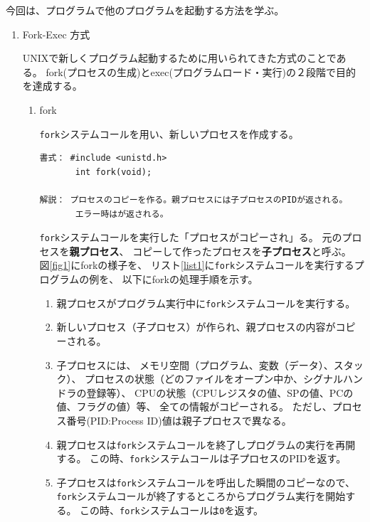 \documentclass[a4j,dvipdfmx]{jarticle}
\begin{document}
\def\lstlistingname{リスト}


今回は、プログラムで他のプログラムを起動する方法を学ぶ。

\begin{enumerate}
\item Fork-Exec 方式

UNIXで新しくプログラム起動するために用いられてきた方式のことである。
fork(プロセスの生成)とexec(プログラムロード・実行)の２段階で目的を達成する。

\begin{enumerate}
\item fork

\verb/fork/システムコールを用い、新しいプロセスを作成する。

\begin{lstlisting}[numbers=none]
書式： #include <unistd.h>
       int fork(void);

解説： プロセスのコピーを作る。親プロセスには子プロセスのPIDが返される。
       エラー時はが返される。
\end{lstlisting}

\verb/fork/システムコールを実行した「プロセスがコピーされ」る。
元のプロセスを{\bf 親プロセス}、
コピーして作ったプロセスを{\bf 子プロセス}と呼ぶ。
図\ref{fig1}にforkの様子を、
リスト\ref{list1}に\verb/fork/システムコールを実行するプログラムの例を、
以下にforkの処理手順を示す。

\begin{enumerate}
\item 親プロセスがプログラム実行中に\verb/fork/システムコールを実行する。
\item 新しいプロセス（子プロセス）が作られ、親プロセスの内容がコピーされる。
\item 子プロセスには、
メモリ空間（プログラム、変数（データ）、スタック）、
プロセスの状態（どのファイルをオープン中か、シグナルハンドラの登録等）、
CPUの状態（CPUレジスタの値、SPの値、PCの値、フラグの値）等、
全ての情報がコピーされる。
ただし、プロセス番号(PID:Process ID)値は親子プロセスで異なる。
\item 親プロセスは\verb/fork/システムコールを終了しプログラムの実行を再開する。
この時、\verb/fork/システムコールは子プロセスのPIDを返す。
\item 子プロセスは\verb/fork/システムコールを呼出した瞬間のコピーなので、
\verb/fork/システムコールが終了するところからプログラム実行を開始する。
この時、\verb/fork/システムコールは\verb/0/を返す。
\end{enumerate}


\end{enumerate}
\end{enumerate}
\end{document}
